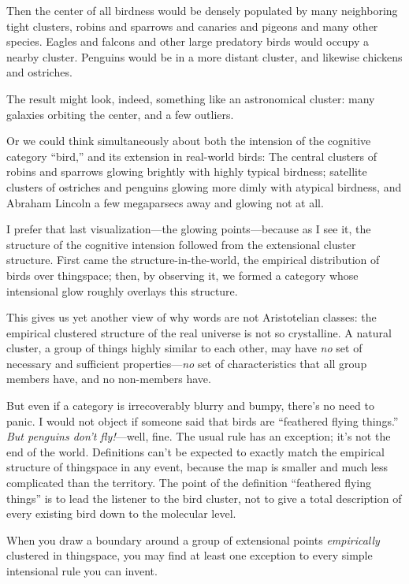 {
 Then the center of all birdness would be densely populated by many
neighboring tight clusters, robins and sparrows and canaries and
pigeons and many other species. Eagles and falcons and other large
predatory birds would occupy a nearby cluster. Penguins would be in a
more distant cluster, and likewise chickens and ostriches.}

{
 The result might look, indeed, something like an astronomical
cluster: many galaxies orbiting the center, and a few outliers.}

{
 Or we could think simultaneously about both the intension of the
cognitive category ``bird,'' and its
extension in real-world birds: The central clusters of robins and
sparrows glowing brightly with highly typical birdness; satellite
clusters of ostriches and penguins glowing more dimly with atypical
birdness, and Abraham Lincoln a few megaparsecs away and glowing not at
all.}

{
 I prefer that last visualization---the glowing points---because as
I see it, the structure of the cognitive intension followed from the
extensional cluster structure. First came the structure-in-the-world,
the empirical distribution of birds over thingspace; then, by observing
it, we formed a category whose intensional glow roughly overlays this
structure.}

{
 This gives us yet another view of why words are not Aristotelian
classes: the empirical clustered structure of the real universe is not
so crystalline. A natural cluster, a group of things highly similar to
each other, may have \textit{no} set of necessary and sufficient
properties---\textit{no} set of characteristics that all group members
have, and no non-members have.}

{
 But even if a category is irrecoverably blurry and bumpy,
there's no need to panic. I would not object if someone
said that birds are ``feathered flying
things.'' \textit{But penguins don't
fly!}{}---well, fine. The usual rule has an exception;
it's not the end of the world. Definitions
can't be expected to exactly match the empirical
structure of thingspace in any event, because the map is smaller and
much less complicated than the territory. The point of the definition
``feathered flying things'' is to
lead the listener to the bird cluster, not to give a total description
of every existing bird down to the molecular level.}

{
 When you draw a boundary around a group of extensional points
\textit{empirically} clustered in thingspace, you may find at least one
exception to every simple intensional rule you can invent.}

